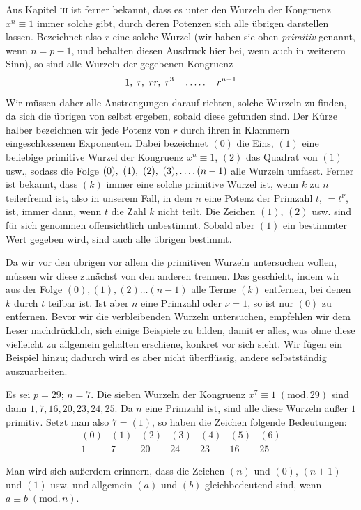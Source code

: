 Aus Kapitel \textsc{iii} ist ferner bekannt, dass es unter den Wurzeln der Kongruenz $x^n\equiv1$ immer solche gibt, durch deren Potenzen sich alle übrigen darstellen lassen. Bezeichnet also $r$ eine solche Wurzel (wir haben sie oben \emph{primitiv} genannt, wenn $n=p-1$, und behalten diesen Ausdruck hier bei, wenn auch in weiterem Sinn), so sind alle Wurzeln der gegebenen Kongruenz
\[
1,\ r,\ rr,\ r^3\quad\mathinner{.\,.\,.\,.\,.}\quad r^{n-1}
\]
Wir müssen daher alle Anstrengungen darauf richten, solche Wurzeln zu finden, da sich die übrigen von selbst ergeben, sobald diese gefunden sind. Der Kürze halber bezeichnen wir jede Potenz von $r$ durch ihren in Klammern eingeschlossenen Exponenten. Dabei bezeichnet $(0)$ die Eins, $(1)$ eine beliebige primitive Wurzel der Kongruenz $x^n\equiv1$, $(2)$ das Quadrat von $(1)$ usw., sodass die Folge $(0),\ (1),\ (2),\ (3),\dotsfour(n-1)$ alle Wurzeln umfasst. Ferner ist bekannt, dass $(k)$ immer eine solche primitive Wurzel ist, wenn $k$ zu $n$ teilerfremd ist, also in unserem Fall, in dem $n$ eine Potenz der Primzahl $t$, $=t^\nu$, ist, immer dann, wenn $t$ die Zahl $k$ nicht teilt. Die Zeichen $(1)$, $(2)$ usw. sind für sich genommen offensichtlich unbestimmt. Sobald aber $(1)$ ein bestimmter Wert gegeben wird, sind auch alle übrigen bestimmt.

Da wir vor den übrigen vor allem die primitiven Wurzeln untersuchen wollen, müssen wir diese zunächst von den anderen trennen. Das geschieht, indem wir aus der Folge $(0),(1),(2)\ldots(n-1)$ alle Terme $(k)$ entfernen, bei denen $k$ durch $t$ teilbar ist. Ist aber $n$ eine Primzahl oder $\nu=1$, so ist nur $(0)$ zu entfernen. Bevor wir die verbleibenden Wurzeln untersuchen, empfehlen wir dem Leser nachdrücklich, sich einige Beispiele zu bilden, damit er alles, was ohne diese vielleicht zu allgemein gehalten erschiene, konkret vor sich sieht. Wir fügen ein Beispiel hinzu; dadurch wird es aber nicht überflüssig, andere selbstständig auszuarbeiten.

Es sei $p=29$; $n=7$. Die sieben Wurzeln der Kongruenz $x^7\equiv1\;(\mathrm{mod.}\,29)$ sind dann $1,7,16,20,23,24,25$. Da $n$ eine Primzahl ist, sind alle diese Wurzeln außer $1$ primitiv. Setzt man also $7=(1)$, so haben die Zeichen folgende Bedeutungen:
\[
\begin{array}{ccccccc}
(0)&(1)&(2)&(3)&(4)&(5)&(6)\\
1&7&20&24&23&16&25
\end{array}
\]

Man wird sich außerdem erinnern, dass die Zeichen $(n)$ und $(0)$, $(n+1)$ und $(1)$ usw. und allgemein $(a)$ und $(b)$ gleichbedeutend sind, wenn $a\equiv b\;(\mathrm{mod.}\,n)$.

